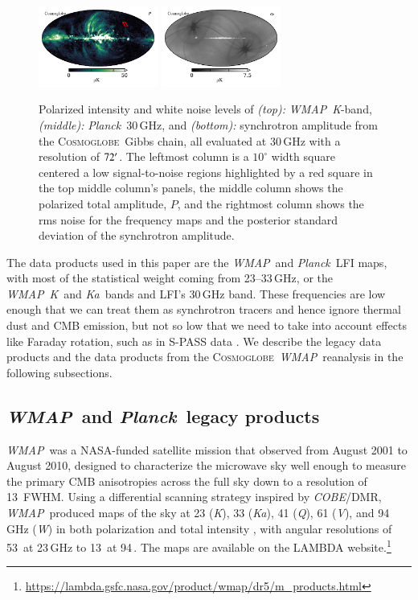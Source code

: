 \documentclass[twocolumn]{../../common/aa}
\def\WMAP{\emph{WMAP}}
\def\COBE{\emph{COBE}}
\def\Planck{\emph{Planck}}
\newcommand{\cosmoglobe}{\textsc{Cosmoglobe}}
\newcommand{\K}[0]{\textit K}
\newcommand{\Ka}[0]{\textit{Ka}}
\newcommand{\Q}[0]{\textit Q}
\newcommand{\V}[0]{\textit V}
\newcommand{\W}[0]{\textit W}
\begin{document}
\begin{figure}
	\includegraphics[width=0.35\textwidth]{figures/polint_CG.pdf}
	\includegraphics[width=0.35\textwidth]{figures/polint_CG_sigma.pdf}
	\caption{
		Polarized intensity and white noise levels of \textit{(top):} \WMAP\ \K-band, \textit{(middle):} \Planck\ 30\,GHz, and \textit{(bottom):} synchrotron amplitude from the \cosmoglobe\ Gibbs chain, all evaluated at 30\,GHz with a resolution of $72\arcm$. The leftmost column is a $10^\circ$ width square centered a low signal-to-noise regions highlighted by a red square in the top middle column's panels, the middle column shows the polarized total amplitude, $P$, and the rightmost column shows the rms noise for the frequency maps and the posterior standard deviation of the synchrotron amplitude.
		}
       \label{fig:synch_polint}
\end{figure}


The data products used in this paper are the \WMAP\ and \Planck\ LFI maps, with most of the statistical weight coming from 23--33\,GHz, or the \WMAP\ \K\ and \Ka\ bands and LFI's 30\,GHz band. These frequencies are low enough that we can treat them as synchrotron tracers and hence ignore thermal dust and CMB emission, but not so low that we need to take into account effects like Faraday rotation, such as in S-PASS data \citep{krachmalnicoff2018,fuskeland:2019}. We describe the legacy data products and the data products from the \cosmoglobe\ \WMAP\ reanalysis in the following subsections.


\subsection{\WMAP\ and \Planck\ legacy products}
\label{sec:wmap_data}

\WMAP\ was a NASA-funded satellite mission that observed from August 2001 to August 2010, designed to characterize the microwave sky well enough to measure the primary CMB anisotropies across the full sky down to a resolution of 13\arcm\ FWHM. Using a differential scanning strategy inspired by \COBE/DMR,
\WMAP\ produced maps of the sky at 23 (\K), 33 (\Ka), 41 (\Q), 61 (\V), and 94\,GHz (\W) in both polarization and total intensity \citep{bennett2012}, with angular resolutions of 53\arcm\ at 23\,GHz to 13\arcm\ at 94\,\GHz. 
The maps are available on the LAMBDA website.\footnote{\url{https://lambda.gsfc.nasa.gov/product/wmap/dr5/m_products.html}} 
\end{document}
